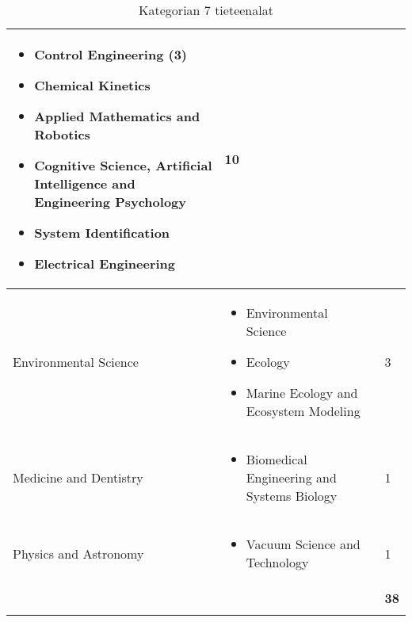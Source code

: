 \documentclass[utf8]{gradu3}
\begin{document}
\begin{longtable}[h]{|p{5cm}|p{8cm}|p{1cm}|}
\begin{itemize}
        \item Control Engineering (3)
        \item Chemical Kinetics
        \item Applied Mathematics and Robotics
        \item Cognitive Science, Artificial Intelligence and Engineering Psychology
        \item System Identification
        \item Electrical Engineering
    \end{itemize} & 10 \\
    \hline
    Environmental Science & \begin{itemize}
        \item Environmental Science
        \item Ecology
        \item Marine Ecology and Ecosystem Modeling
    \end{itemize} & 3 \\
    \hline
    Medicine and Dentistry & \begin{itemize}
        \item Biomedical Engineering and Systems Biology
    \end{itemize} & 1 \\
    \hline
    Physics and Astronomy & \begin{itemize}
        \item Vacuum Science and Technology
    \end{itemize} & 1 \\
    \hline
       &   & \textbf{38} \\
    \hline
    \caption{Kategorian 7 tieteenalat}
    \label{table:Kategorian 7 tieteenalat}
\end{longtable}
\end{document}
